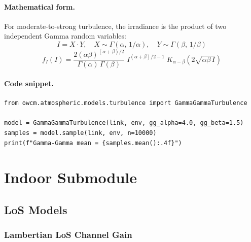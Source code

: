\documentclass[11pt,a4paper]{article}
\begin{document}
\paragraph{Mathematical form.}
For moderate-to-strong turbulence, the irradiance is the product of two
independent Gamma random variables:
\begin{equation}
I = X \cdot Y, \quad
X \sim \Gamma(\alpha,\,1/\alpha), \quad
Y \sim \Gamma(\beta,\,1/\beta)
\end{equation}
\begin{equation}
\boxed{f_I(I) = \frac{2(\alpha\beta)^{(\alpha+\beta)/2}}
{\Gamma(\alpha)\,\Gamma(\beta)}\;
I^{(\alpha+\beta)/2-1}\;
K_{\alpha-\beta}\!\left(2\sqrt{\alpha\beta\,I}\right)}
\end{equation}

\paragraph{Code snippet.}
\begin{lstlisting}
from owcm.atmospheric.models.turbulence import GammaGammaTurbulence

model = GammaGammaTurbulence(link, env, gg_alpha=4.0, gg_beta=1.5)
samples = model.sample(link, env, n=10000)
print(f"Gamma-Gamma mean = {samples.mean():.4f}")
\end{lstlisting}


\newpage
\section{Indoor Submodule}

\subsection{LoS Models}

\subsubsection{Lambertian LoS Channel Gain}
\label{sec:indoor_lambertian_los}
\end{document}
